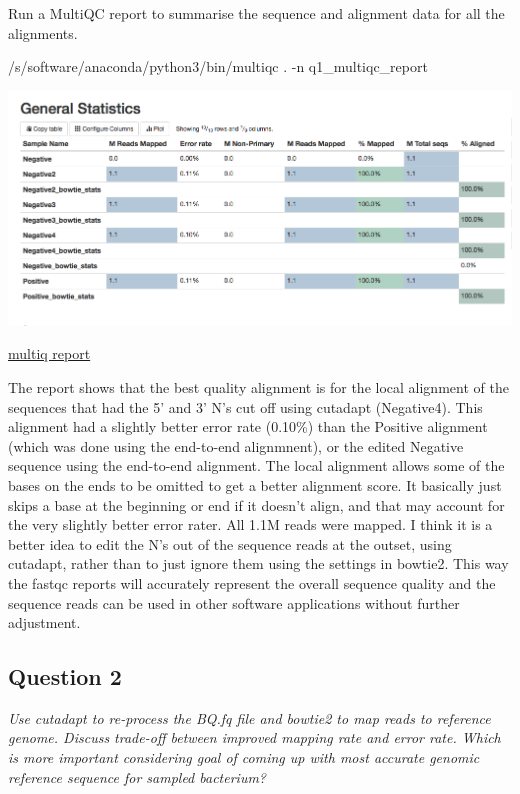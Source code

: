 \documentclass[]{article}
\newenvironment{Shaded}{\begin{snugshade}}{\end{snugshade}}
\newcommand{\ExtensionTok}[1]{#1}
\newcommand{\NormalTok}[1]{#1}
\begin{document}
Run a MultiQC report to summarise the sequence and alignment data for
all the alignments.

\begin{Shaded}
\begin{Highlighting}[]
\ExtensionTok{/s/software/anaconda/python3/bin/multiqc}\NormalTok{ . -n q1_multiqc_report}
\end{Highlighting}
\end{Shaded}

\includegraphics{MultiQCstats_Q1.png}

\href{/d/projects/u/sj003/results_cw1/q1_multiqc_report.html}{multiq
report}

The report shows that the best quality alignment is for the local
alignment of the sequences that had the 5' and 3' N's cut off using
cutadapt (Negative4). This alignment had a slightly better error rate
(0.10\%) than the Positive alignment (which was done using the
end-to-end alignmnent), or the edited Negative sequence using the
end-to-end alignment. The local alignment allows some of the bases on
the ends to be omitted to get a better alignment score. It basically
just skips a base at the beginning or end if it doesn't align, and that
may account for the very slightly better error rater. All 1.1M reads
were mapped. I think it is a better idea to edit the N's out of the
sequence reads at the outset, using cutadapt, rather than to just ignore
them using the settings in bowtie2. This way the fastqc reports will
accurately represent the overall sequence quality and the sequence reads
can be used in other software applications without further adjustment.

\subsection{Question 2}\label{question-2}

\emph{Use cutadapt to re-process the BQ.fq file and bowtie2 to map reads
to reference genome. Discuss trade-off between improved mapping rate and
error rate. Which is more important considering goal of coming up with
most accurate genomic reference sequence for sampled bacterium?}
\end{document}
